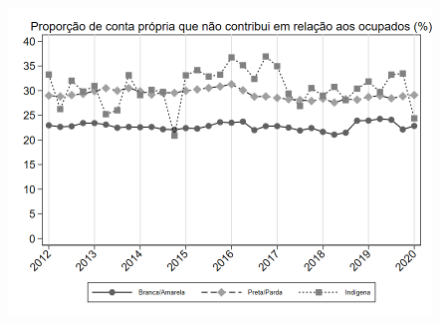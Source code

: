 \begin{frame}[label=_composicao_demografica_raca_prop_cpropriaNc]{}
\textit{\hyperlink{_composicao_demografica_raca}{}}
\begin{figure}
  \centering
  \includegraphics[width=1.0\linewidth]{../../analysis/output/composicao_demografica/raca/_composicao_demografica_raca_prop_cpropriaNc.png}
  \caption{}
  \label{fig:_composicao_demografica_raca_prop_cpropriaNc}
\end{figure}
\end{frame}